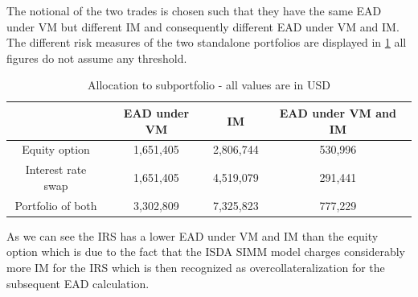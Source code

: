 \documentclass[../Thesis_AHoecherl.tex]{subfiles}
\begin{document}
    The notional of the two trades is chosen such that they have the same \gls{EAD} under \gls{VM} but different \gls{IM} and consequently different \gls{EAD} under \gls{VM} and IM. 
    The different risk measures of the two standalone portfolios are displayed in \ref{tab:IM threshold example standalone} all figures do not assume any threshold.
    \begin{table}[htbp]
        \centering
        \begin{tabular}{c|c|c|c}
            & \gls{EAD} under \gls{VM} & \gls{IM} & \gls{EAD} under \gls{VM} and \gls{IM} \\
            \toprule
            Equity option & 1,651,405 & 2,806,744 & 530,996 \\
            Interest rate swap& 1,651,405 & 4,519,079 & 291,441 \\
            \midrule
            Portfolio of both& 3,302,809 & 7,325,823 & 777,229 \\
        \end{tabular}%
        \caption[Allocation to subportfolios]{Allocation to subportfolio - all values are in USD}
        \label{tab:IM threshold example standalone}
    \end{table}
    As we can see the \gls{IRS} has a lower \gls{EAD} under \gls{VM} and \gls{IM} than the equity option which is due to the fact that the \gls{ISDA SIMM} model charges considerably more \gls{IM} for the \gls{IRS} which is then recognized as overcollateralization for the subsequent \gls{EAD} calculation.
\end{document}
